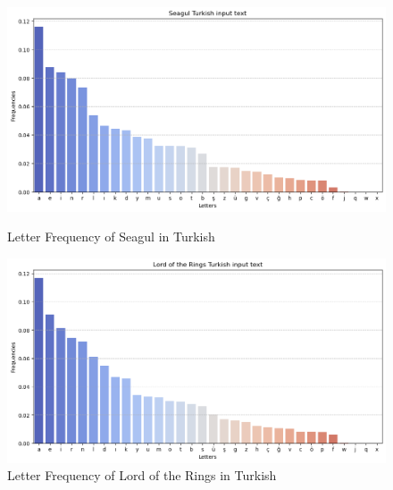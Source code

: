 \begin{figure}[htbp]
    \centering
    \begin{minipage}[b]{0.45\textwidth}
        \centering
        \includegraphics[width=\textwidth]{media/seagulTurkish.png} 
        \caption{Letter Frequency of Seagul in Turkish}
    \end{minipage}
    \hfill
    \begin{minipage}[b]{0.45\textwidth}
        \centering
        \includegraphics[width=\textwidth]{media/lordOfTheRingsTurkish.png}
        \caption{Letter Frequency of Lord of the Rings in Turkish}
    \end{minipage}
\end{figure}

